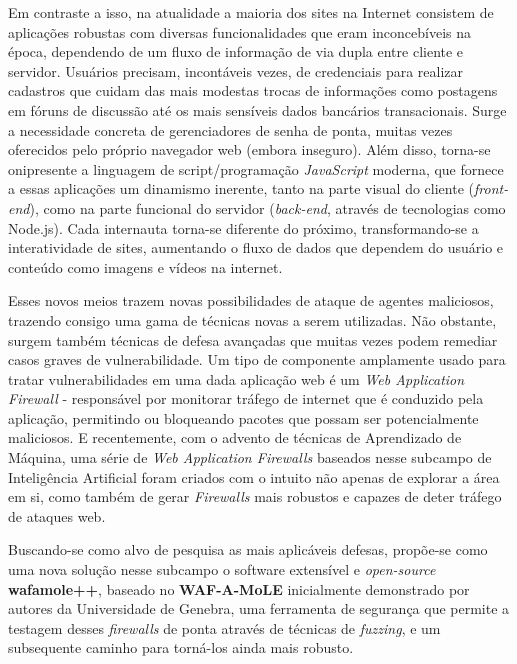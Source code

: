 Em contraste a isso, na atualidade a maioria dos sites na Internet consistem de aplicações robustas com diversas funcionalidades que eram inconcebíveis na época, dependendo de um fluxo de informação de via dupla entre cliente e servidor. Usuários precisam, incontáveis vezes, de credenciais para realizar cadastros que cuidam das mais modestas trocas de informações como postagens em fóruns de discussão até os mais sensíveis dados bancários transacionais. Surge a necessidade concreta de gerenciadores de senha de ponta, muitas vezes oferecidos pelo próprio navegador web (embora inseguro). Além disso, torna-se onipresente a linguagem de script/programação \textit{JavaScript} moderna, que fornece a essas aplicações um dinamismo inerente, tanto na parte visual do cliente (\textit{front-end}), como na parte funcional do servidor (\textit{back-end}, através de tecnologias como Node.js). Cada internauta torna-se diferente do próximo, transformando-se a interatividade de sites, aumentando o fluxo de dados que dependem do usuário e conteúdo como imagens e vídeos na internet.

Esses novos meios trazem novas possibilidades de ataque de agentes maliciosos, trazendo consigo uma gama de técnicas novas a serem utilizadas. Não obstante, surgem também técnicas de defesa avançadas que muitas vezes podem remediar casos graves de vulnerabilidade. Um tipo de componente amplamente usado para tratar vulnerabilidades em uma dada aplicação web é um \textit{Web Application Firewall} - responsável por monitorar tráfego de internet que é conduzido pela aplicação, permitindo ou bloqueando pacotes que possam ser potencialmente maliciosos. E recentemente, com o advento de técnicas de Aprendizado de Máquina, uma série de \textit{Web Application Firewalls} baseados nesse subcampo de Inteligência Artificial foram criados com o intuito não apenas de explorar a área em si, como também de gerar \textit{Firewalls} mais robustos e capazes de deter tráfego de ataques web. 

Buscando-se como alvo de pesquisa as mais aplicáveis defesas, propõe-se como uma nova solução nesse subcampo o software extensível e \textit{open-source}  \textbf{wafamole++}, baseado no \textbf{WAF-A-MoLE} \cite{valenza_waf--mole_2020} inicialmente demonstrado por autores da Universidade de Genebra, uma ferramenta de segurança que permite a testagem desses \textit{firewalls} de ponta através de técnicas de \textit{fuzzing}, e um subsequente caminho para torná-los ainda mais robusto. 

